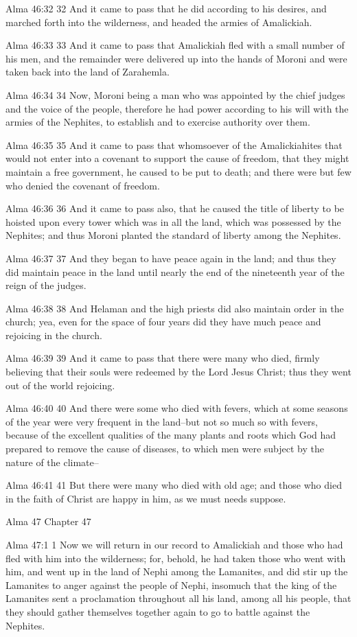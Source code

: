 Alma 46:32
 32 And it came to pass that he did according to his desires, and
marched forth into the wilderness, and headed the armies of
Amalickiah.

Alma 46:33
 33 And it came to pass that Amalickiah fled with a small number
of his men, and the remainder were delivered up into the hands of
Moroni and were taken back into the land of Zarahemla.

Alma 46:34
 34 Now, Moroni being a man who was appointed by the chief judges
and the voice of the people, therefore he had power according to
his will with the armies of the Nephites, to establish and to
exercise authority over them.

Alma 46:35
 35 And it came to pass that whomsoever of the Amalickiahites
that would not enter into a covenant to support the cause of
freedom, that they might maintain a free government, he caused to
be put to death; and there were but few who denied the covenant
of freedom.

Alma 46:36
 36 And it came to pass also, that he caused the title of liberty
to be hoisted upon every tower which was in all the land, which
was possessed by the Nephites; and thus Moroni planted the
standard of liberty among the Nephites.

Alma 46:37
 37 And they began to have peace again in the land; and thus they
did maintain peace in the land until nearly the end of the
nineteenth year of the reign of the judges.

Alma 46:38
 38 And Helaman and the high priests did also maintain order in
the church; yea, even for the space of four years did they have
much peace and rejoicing in the church.

Alma 46:39
 39 And it came to pass that there were many who died, firmly
believing that their souls were redeemed by the Lord Jesus
Christ; thus they went out of the world rejoicing.

Alma 46:40
 40 And there were some who died with fevers, which at some
seasons of the year were very frequent in the land--but not so
much so with fevers, because of the excellent qualities of the
many plants and roots which God had prepared to remove the cause
of diseases, to which men were subject by the nature of the
climate--

Alma 46:41
 41 But there were many who died with old age; and those who died
in the faith of Christ are happy in him, as we must needs
suppose.

Alma 47
Chapter 47

Alma 47:1
 1 Now we will return in our record to Amalickiah and those who
had fled with him into the wilderness; for, behold, he had taken
those who went with him, and went up in the land of Nephi among
the Lamanites, and did stir up the Lamanites to anger against the
people of Nephi, insomuch that the king of the Lamanites sent a
proclamation throughout all his land, among all his people, that
they should gather themselves together again to go to battle
against the Nephites.

